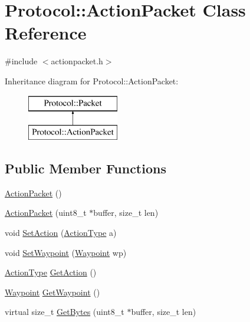 \hypertarget{class_protocol_1_1_action_packet}{}\section{Protocol\+:\+:Action\+Packet Class Reference}
\label{class_protocol_1_1_action_packet}


{\ttfamily \#include $<$actionpacket.\+h$>$}

Inheritance diagram for Protocol\+:\+:Action\+Packet\+:\begin{figure}[H]
\begin{center}
\leavevmode
\includegraphics[height=2.000000cm]{class_protocol_1_1_action_packet}
\end{center}
\end{figure}
\subsection*{Public Member Functions}
\begin{DoxyCompactItemize}
\item 
\hyperlink{class_protocol_1_1_action_packet_a9057809acd70d7445a3c79667d6a746c}{Action\+Packet} ()
\item 
\hyperlink{class_protocol_1_1_action_packet_ae37774554c838433daa49f2fcd8439a7}{Action\+Packet} (uint8\+\_\+t $\ast$buffer, size\+\_\+t len)
\item 
void \hyperlink{class_protocol_1_1_action_packet_ac59aeacf4f0566ce327bdbacd8594687}{Set\+Action} (\hyperlink{namespace_protocol_a95f2e35dc2d8d920f0d7ddaaf122c3b9}{Action\+Type} a)
\item 
void \hyperlink{class_protocol_1_1_action_packet_a2f6167c9e92ea9914bf9a39de3fcd3e9}{Set\+Waypoint} (\hyperlink{struct_protocol_1_1_waypoint}{Waypoint} wp)
\item 
\hyperlink{namespace_protocol_a95f2e35dc2d8d920f0d7ddaaf122c3b9}{Action\+Type} \hyperlink{class_protocol_1_1_action_packet_ae90be2ee603b6968cc1515e32e0e1057}{Get\+Action} ()
\item 
\hyperlink{struct_protocol_1_1_waypoint}{Waypoint} \hyperlink{class_protocol_1_1_action_packet_a4897181b5915534b25c94f1e4c9d40ba}{Get\+Waypoint} ()
\item 
virtual size\+\_\+t \hyperlink{class_protocol_1_1_action_packet_af5963f7c15af8292152df260b188f626}{Get\+Bytes} (uint8\+\_\+t $\ast$buffer, size\+\_\+t len)
\end{DoxyCompactItemize}
